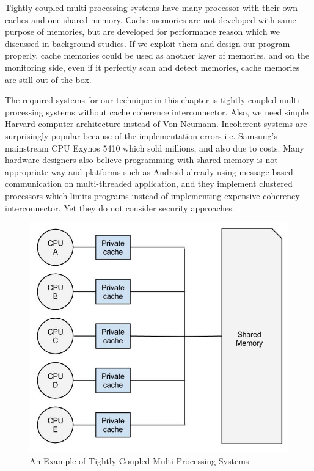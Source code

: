 Tightly coupled multi-processing systems have many processor with their own caches and one shared memory\cite{Jim2007}. Cache memories are not developed with same purpose of memories, but are developed for performance reason which we discussed in background studies. If we exploit them and design our program properly, cache memories could be used as another layer of memories, and on the monitoring side, even if it perfectly scan and detect memories, cache memories are still out of the box.

The required systems for our technique in this chapter is tightly coupled multi-processing systems without cache coherence interconnector. Also, we need simple Harvard computer architecture instead of Von Neumann. Incoherent systems are surprisingly popular because of the implementation errors i.e. Samsung's mainstream CPU Exynos 5410 which sold millions, and also due to costs. Many hardware designers also believe programming with shared memory is not appropriate way and platforms such as Android already using message based communication on multi-threaded application, and  they implement clustered processors which limits programs instead of implementing expensive coherency interconnector. Yet they do not consider security approaches.
    \begin{figure}[h!]
        \centering
        \includegraphics[width=1\textwidth]{img/Tightly Coupled Multi-Processing Systems.jpg}
        \caption{An Example of Tightly Coupled Multi-Processing Systems}
        \label{fig:tightlycoupled}
    \end{figure}
	

